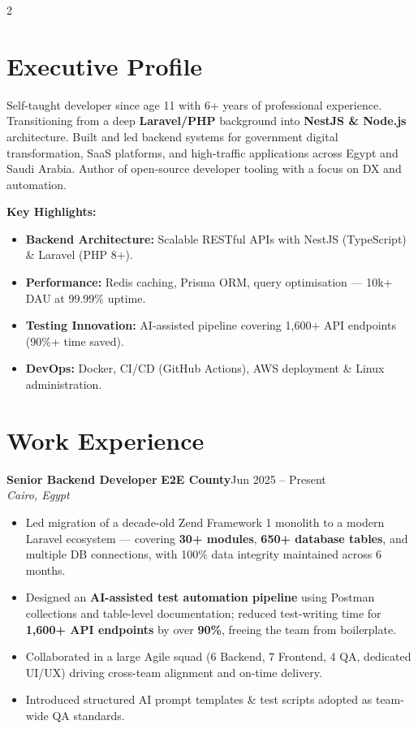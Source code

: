 \documentclass[10pt, a4paper]{article}
\newcommand{\job}[4]{%
  \vspace{5pt}%
  {\bfseries\color{Dark}#1}\enspace{\color{Light}|}\enspace%
  {\bfseries\color{Blue}#2}\hfill{\footnotesize\color{Light}#3}\\%
  {\small\itshape\color{Light}#4}\vspace{2pt}%
}
\newcommand{\bitem}[1]{%
  \item\small{\color{Mid}#1}%
}
\newenvironment{blist}{%
  \begin{itemize}[leftmargin=0.18in, itemsep=1pt, topsep=1pt, parsep=0pt]%
}{%
  \end{itemize}%
}
\begin{document}
\begin{paracol}{2}


\section{Executive Profile}

{\small\color{Mid}
Self-taught developer since age 11 with 6+ years of professional experience.
Transitioning from a deep \textbf{Laravel/PHP} background into \textbf{NestJS \& Node.js} architecture.
Built and led backend systems for government digital transformation, SaaS platforms,
and high-traffic applications across Egypt and Saudi Arabia.
Author of open-source developer tooling with a focus on DX and automation.}

\vspace{5pt}
{\small\bfseries\color{Dark}Key Highlights:}
\begin{blist}
  \bitem{\textbf{Backend Architecture:} Scalable RESTful APIs with NestJS (TypeScript) \& Laravel (PHP 8+).}
  \bitem{\textbf{Performance:} Redis caching, Prisma ORM, query optimisation — 10k+ DAU at 99.99\% uptime.}
  \bitem{\textbf{Testing Innovation:} AI-assisted pipeline covering 1,600+ API endpoints (90\%+ time saved).}
  \bitem{\textbf{DevOps:} Docker, CI/CD (GitHub Actions), AWS deployment \& Linux administration.}
\end{blist}

\section{Work Experience}

\job{Senior Backend Developer}{E2E County}{Jun 2025 – Present}{Cairo, Egypt}
\begin{blist}
  \bitem{Led migration of a decade-old Zend Framework 1 monolith to a modern Laravel ecosystem — covering \textbf{30+ modules}, \textbf{650+ database tables}, and multiple DB connections, with 100\% data integrity maintained across 6 months.}
  \bitem{Designed an \textbf{AI-assisted test automation pipeline} using Postman collections and table-level documentation; reduced test-writing time for \textbf{1,600+ API endpoints} by over \textbf{90\%}, freeing the team from boilerplate.}
  \bitem{Collaborated in a large Agile squad (6 Backend, 7 Frontend, 4 QA, dedicated UI/UX) driving cross-team alignment and on-time delivery.}
  \bitem{Introduced structured AI prompt templates \& test scripts adopted as team-wide QA standards.}
\end{blist}


\end{paracol}
\end{document}
